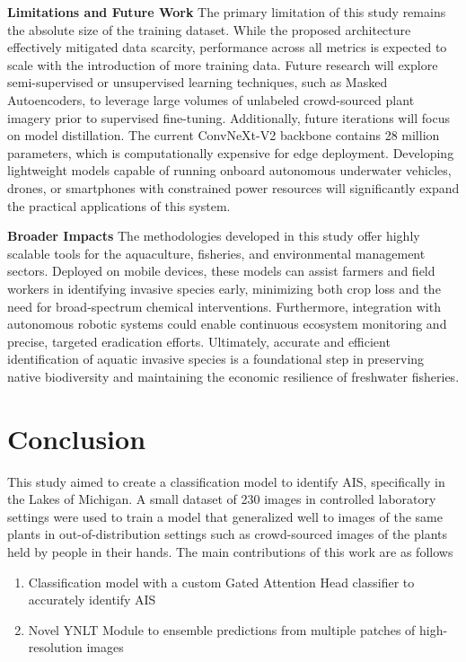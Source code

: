\documentclass[final,3p,times,twocolumn]{elsarticle}
\begin{document}
\textbf{Limitations and Future Work}
The primary limitation of this study remains the absolute size of the training dataset. While the proposed architecture effectively mitigated data scarcity, performance across all metrics is expected to scale with the introduction of more training data. Future research will explore semi-supervised or unsupervised learning techniques, such as Masked Autoencoders, to leverage large volumes of unlabeled crowd-sourced plant imagery prior to supervised fine-tuning. Additionally, future iterations will focus on model distillation. The current ConvNeXt-V2 backbone contains 28 million parameters, which is computationally expensive for edge deployment. Developing lightweight models capable of running onboard autonomous underwater vehicles, drones, or smartphones with constrained power resources will significantly expand the practical applications of this system.

\textbf{Broader Impacts}
The methodologies developed in this study offer highly scalable tools for the aquaculture, fisheries, and environmental management sectors. Deployed on mobile devices, these models can assist farmers and field workers in identifying invasive species early, minimizing both crop loss and the need for broad-spectrum chemical interventions. Furthermore, integration with autonomous robotic systems could enable continuous ecosystem monitoring and precise, targeted eradication efforts. Ultimately, accurate and efficient identification of aquatic invasive species is a foundational step in preserving native biodiversity and maintaining the economic resilience of freshwater fisheries.



\section{Conclusion}
\label{sec:conclu}
This study aimed to create a classification model to identify AIS, specifically in the Lakes of Michigan. A small dataset of 230 images in controlled laboratory settings were used to train a model that generalized well to images of the same plants in out-of-distribution settings such as crowd-sourced images of the plants held by people in their hands.
The main contributions of this work are as follows
\begin{enumerate}
    \item Classification model with a custom Gated Attention Head classifier to accurately identify AIS
    \item Novel YNLT Module to ensemble predictions from multiple patches of high-resolution images
\end{enumerate}
\end{document}
